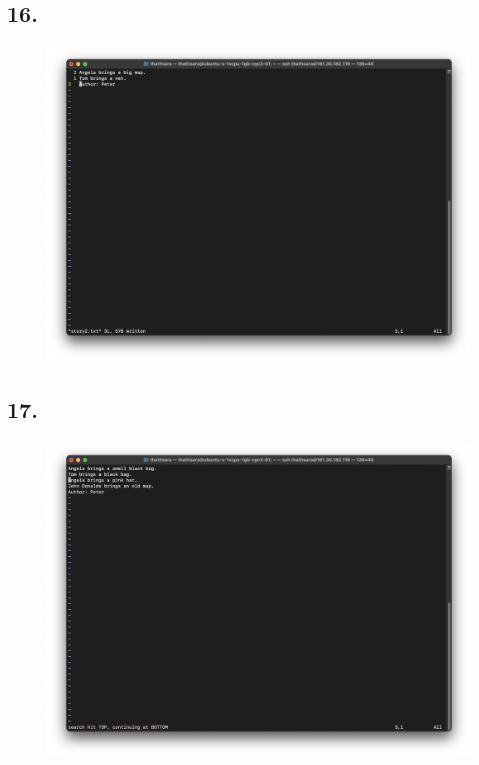 \documentclass{article}
\begin{document}
    \subsection*{16.}
    \begin{figure}[H]
        \centering
        \includegraphics[width=\textwidth]{2/16.png}
    \end{figure}

    \subsection*{17.}
    \begin{figure}[H]
        \centering
        \includegraphics[width=\textwidth]{2/17.png}
    \end{figure}
\end{document}
